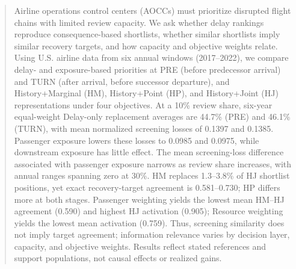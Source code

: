 \begin{abstract}
Airline operations control centers (AOCCs) must prioritize disrupted flight chains with limited review capacity. We ask whether delay rankings reproduce consequence-based shortlists, whether similar shortlists imply similar recovery targets, and how capacity and objective weights relate. Using U.S. airline data from six annual windows (2017--2022), we compare delay- and exposure-based priorities at PRE (before predecessor arrival) and TURN (after arrival, before successor departure), and History+Marginal (HM), History+Point (HP), and History+Joint (HJ) representations under four objectives. At a 10\% review share, six-year equal-weight Delay-only replacement averages are 44.7\% (PRE) and 46.1\% (TURN), with mean normalized screening losses of 0.1397 and 0.1385. Passenger exposure lowers these losses to 0.0985 and 0.0975, while downstream exposure has little effect. The mean screening-loss difference associated with passenger exposure narrows as review share increases, with annual ranges spanning zero at 30\%. HM replaces 1.3--3.8\% of HJ shortlist positions, yet exact recovery-target agreement is 0.581--0.730; HP differs more at both stages. Passenger weighting yields the lowest mean HM--HJ agreement (0.590) and highest HJ activation (0.905); Resource weighting yields the lowest mean activation (0.759). Thus, screening similarity does not imply target agreement; information relevance varies by decision layer, capacity, and objective weights. Results reflect stated references and support populations, not causal effects or realized gains.
\end{abstract}
